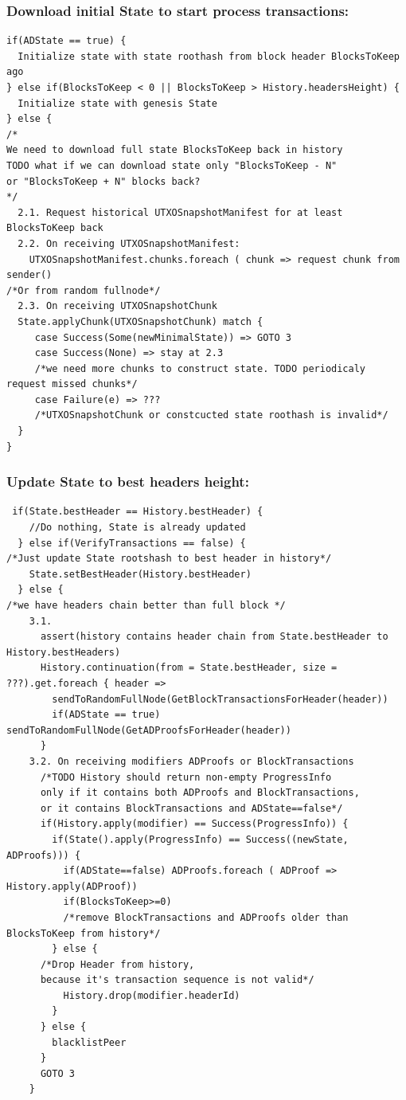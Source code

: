 \documentclass[]{article}   %
\begin{document}
\subsubsection{Download initial State to start process transactions:}
\begin{verbatim}
if(ADState == true) {
  Initialize state with state roothash from block header BlocksToKeep ago
} else if(BlocksToKeep < 0 || BlocksToKeep > History.headersHeight) {
  Initialize state with genesis State
} else {
/*
We need to download full state BlocksToKeep back in history
TODO what if we can download state only "BlocksToKeep - N"
or "BlocksToKeep + N" blocks back?
*/
  2.1. Request historical UTXOSnapshotManifest for at least BlocksToKeep back
  2.2. On receiving UTXOSnapshotManifest:
    UTXOSnapshotManifest.chunks.foreach ( chunk => request chunk from sender()
/*Or from random fullnode*/
  2.3. On receiving UTXOSnapshotChunk
  State.applyChunk(UTXOSnapshotChunk) match {
     case Success(Some(newMinimalState)) => GOTO 3
     case Success(None) => stay at 2.3
     /*we need more chunks to construct state. TODO periodicaly request missed chunks*/
     case Failure(e) => ???
     /*UTXOSnapshotChunk or constcucted state roothash is invalid*/
  }
}
\end{verbatim}
\subsubsection{Update State to best headers height:}
\begin{verbatim}
 if(State.bestHeader == History.bestHeader) {
    //Do nothing, State is already updated
  } else if(VerifyTransactions == false) {
/*Just update State rootshash to best header in history*/
    State.setBestHeader(History.bestHeader)
  } else {
/*we have headers chain better than full block */
    3.1.
      assert(history contains header chain from State.bestHeader to History.bestHeaders)
      History.continuation(from = State.bestHeader, size = ???).get.foreach { header =>
        sendToRandomFullNode(GetBlockTransactionsForHeader(header))
        if(ADState == true) sendToRandomFullNode(GetADProofsForHeader(header))
      }
    3.2. On receiving modifiers ADProofs or BlockTransactions
      /*TODO History should return non-empty ProgressInfo
      only if it contains both ADProofs and BlockTransactions,
      or it contains BlockTransactions and ADState==false*/
      if(History.apply(modifier) == Success(ProgressInfo)) {
        if(State().apply(ProgressInfo) == Success((newState, ADProofs))) {
          if(ADState==false) ADProofs.foreach ( ADProof => History.apply(ADProof))
          if(BlocksToKeep>=0)
          /*remove BlockTransactions and ADProofs older than BlocksToKeep from history*/
        } else {
      /*Drop Header from history,
      because it's transaction sequence is not valid*/
          History.drop(modifier.headerId)
        }
      } else {
        blacklistPeer
      }
      GOTO 3
    }
\end{verbatim}
\end{document}

